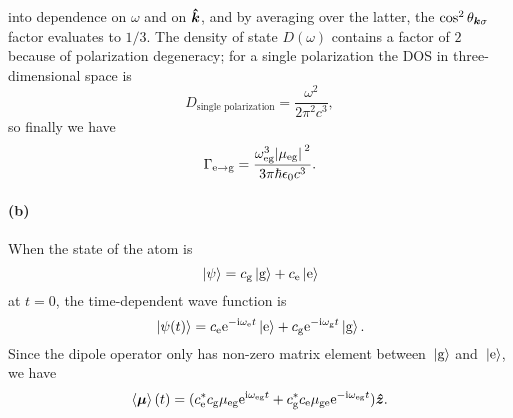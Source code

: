 \documentclass[hyperref, a4paper]{article}
\newcommand*{\ii}{\mathrm{i}}
\newcommand*{\ee}{\mathrm{e}}
\newcommand*{\omegae}{\omega_{\text{e}}}
\newcommand*{\omegag}{\omega_{\text{g}}}
\newcommand*{\omegaeg}{\omega_{\text{eg}}}
\newcommand*{\mueg}{\mu_{\text{eg}}}
\newcommand*{\muge}{\mu_{\text{ge}}}
\newcommand*{\kete}{\ket*{\text{e}}}
\newcommand*{\ketg}{\ket*{\text{g}}}
\newcommand*{\coeffe}{c_{\text{e}}}
\newcommand*{\coeffg}{c_{\text{g}}}
\begin{document}
into dependence on $\omega$ and on $\vu*{k}$,
and by averaging over the latter, 
the $\cos^2 \theta_{\vb*{k} \sigma}$  factor evaluates to $1/3$.
The density of state $D(\omega)$ contains a factor of $2$ 
because of polarization degeneracy;
for a single polarization the DOS in three-dimensional space is 
\begin{equation}
    D_{\text{single polarization}} = \frac{\omega^2}{2 \pi^2 c^3},
\end{equation}
so finally we have 
\begin{equation}
    \Gamma_{\text{e} \to \text{g}} = \frac{
        \omegaeg^3 \abs*{\mueg}^2
    }{
        3 \pi \hbar \epsilon_0 c^3
    }.
    \label{eq:fermi-golden-spontaneous-emission}
\end{equation}

\paragraph{(b)} When the state of the atom is 
\begin{equation}
    \ket*{\psi} = \coeffg \ketg + \coeffe \kete
\end{equation}
at $t = 0$, the time-dependent wave function is 
\begin{equation}
    \ket*{\psi(t)} = \coeffe \ee^{- \ii \omegae t} \kete 
    + \coeffg \ee^{- \ii \omegag t} \ketg.
\end{equation}
Since the dipole operator only has non-zero matrix element 
between $\ketg$ and $\kete$,
we have 
\begin{equation}
    \expval{\vb*{\mu}}(t) = (\coeffe^* \coeffg \mueg \ee^{\ii \omegaeg t}
    + \coeffg^* \coeffe \muge \ee^{- \ii \omegaeg t}) \vu*{z}.
    \label{eq:dipole-expectation-superposition}
\end{equation}
\end{document}
